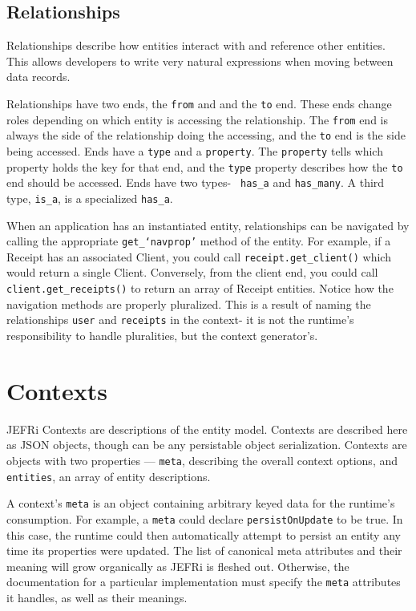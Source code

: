 \documentclass{article}
\newcommand{\ilcode}{\tt}
\begin{document}
\subsection{Relationships}

Relationships describe how entities interact with and reference
other entities. This allows developers to write very natural expressions when
moving between data records.

Relationships have two ends, the {\ilcode from} and and the {\ilcode to} end.
These ends change roles depending on which entity is accessing the relationship.
The {\ilcode from} end is always the side of the relationship doing the
accessing, and the {\ilcode to} end is the side being accessed. Ends have a
{\ilcode type} and a {\ilcode property}. The {\ilcode property} tells which
property holds the key for that end, and the {\ilcode type} property describes
how the {\ilcode to} end should be accessed. Ends have two types- {\ilcode
has\_a} and {\ilcode has\_many}. A third type, {\ilcode is\_a}, is a specialized
{\ilcode has\_a}.

When an application has an instantiated entity, relationships can be navigated
by calling the appropriate {\ilcode get\_`navprop'}
method of the entity. For example, if a Receipt has an associated Client, you
could call {\ilcode receipt.get\_client()} which would return a single Client.
Conversely, from the client end, you could call {\ilcode client.get\_receipts()}
to return an array of Receipt entities. Notice how the navigation methods are
properly pluralized. This is a result of naming the relationships {\ilcode user}
and {\ilcode receipts} in the context- it is not the runtime's responsibility to
handle pluralities, but the context generator's.

\section{Contexts}

JEFRi Contexts are descriptions of the entity model. Contexts are described here
as JSON objects, though can be any persistable object serialization. Contexts
are objects with two properties --- {\ilcode meta}, describing the overall
context options, and {\tt entities}, an array of entity descriptions.

A context's {\ilcode meta} is an object containing arbitrary keyed data for the runtime's
consumption. For example, a {\ilcode meta} could declare {\ilcode persistOnUpdate} to be true.
In this case, the runtime could then automatically attempt to persist an entity
any time its properties were updated. The list of canonical meta attributes and
their meaning will grow organically as JEFRi is fleshed out. Otherwise, the
documentation for a particular implementation must specify the {\ilcode meta} attributes
it handles, as well as their meanings.
\end{document}
